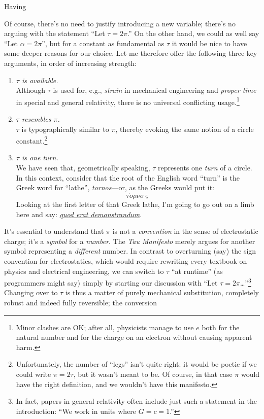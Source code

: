 \documentclass{article}
\begin{document}
Having 

Of course, there's no need to justify introducing a new variable; there's no arguing with the statement ``Let $\tau = 2\pi$.'' On the other hand, we could as well say ``Let $\alpha = 2\pi$'', but for a constant as fundamental as $\tau$ it would be nice to have some deeper reasons for our choice. Let me therefore offer the following three key arguments, in order of increasing strength:

\begin{enumerate}
  \item \emph{$\tau$ is available.} \\ Although $\tau$ is used for, e.g., \emph{strain} in mechanical engineering and \emph{proper time} in special and general relativity, there is no universal conflicting usage.\footnote{Minor clashes are OK; after all, physicists manage to use $e$ both for the natural number and for the charge on an electron without causing apparent harm.} 
  
  \item \emph{$\tau$ resembles $\pi$.} \\ $\tau$ is typographically similar to $\pi$, thereby evoking the same notion of a circle constant.\footnote{Unfortunately, the number of ``legs'' isn't quite right: it would be poetic if we could write $\pi = 2\tau$, but it wasn't meant to be. Of course, in that case $\pi$ would have the right definition, and we wouldn't have this manifesto.}
  
  \item \emph{$\tau$ is one turn.} \\ We have seen that, geometrically speaking, $\tau$ represents one \emph{turn} of a circle. In this context, consider that the root of the English word ``turn'' is the Greek word for ``lathe'', \emph{tornos}---or, as the Greeks would put it: \[ \tau \acute{o}\rho\nu o\varsigma \] \noindent Looking at the first letter of that Greek lathe, I'm going to go out on a limb here and say: \href{http://en.wikipedia.org/wiki/Q.E.D.}{\emph{quod erat demonstrandum}}.
\end{enumerate}


It's essential to understand that $\pi$ is not a \emph{convention} in the sense of electrostatic charge; it's a \emph{symbol} for a \emph{number}. The \emph{Tau Manifesto} merely argues for another symbol representing a \emph{different} number. In contrast to overturning (say) the sign convention for electrostatics, which would require rewriting every textbook on physics and electrical engineering, we can switch to $\tau$ ``at runtime'' (as programmers might say) simply by starting our discussion with ``Let $\tau = 2\pi$\ldots''\footnote{In fact, papers in general relativity often include just such a statement in the introduction: ``We work in units where $G = c = 1$.''} Changing over to $\tau$ is thus a matter of purely mechanical substitution, completely robust and indeed fully reversible; the conversion
\end{document}
